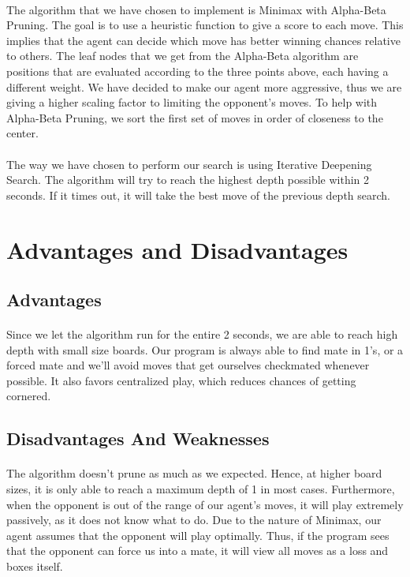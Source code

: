 \documentclass[12pt,a4paper]{article}
\begin{document}
\paragraph{} The algorithm that we have chosen to implement is Minimax with Alpha-Beta Pruning. 
The goal is to use a heuristic function to give a score to each move. This implies that the agent can 
decide which move has better winning chances relative to others. The leaf nodes that we get from the Alpha-Beta 
algorithm are positions that are evaluated according to the three points above, each having a different weight.
We have decided to make our agent more aggressive, thus we are giving a higher scaling factor to limiting the 
opponent's moves. To help with Alpha-Beta Pruning, we sort the first set of moves in order of closeness to the center.
\paragraph{} The way we have chosen to perform our search is using Iterative Deepening Search. The algorithm will try to reach the 
highest depth possible within 2 seconds. If it times out, it will take the best move of the previous depth search. 

\section{Advantages and Disadvantages}
\subsection{Advantages}
\paragraph{} Since we let the algorithm run for the entire 2 seconds, we are able to reach high depth with small size boards. 
Our program is always able to find mate in 1's, or a forced mate and we'll avoid moves that get ourselves 
checkmated whenever possible. 
It also favors centralized play, which reduces chances of getting cornered. 
\subsection{Disadvantages And Weaknesses}
\paragraph{} The algorithm doesn't prune as much as we expected. Hence, at higher board sizes, it is only able to reach a maximum 
depth of 1 in most cases. Furthermore, when the opponent is out of the range of our agent's moves, it will play extremely 
passively, as it does not know what to do. Due to the nature of Minimax, our agent assumes that the opponent will play 
optimally. Thus, if the program sees that the opponent can force us into a mate, it will view all 
moves as a loss and boxes itself. 
\end{document}
